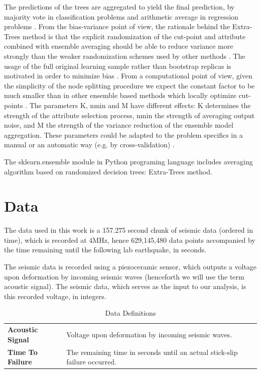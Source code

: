 \documentclass[]{llncs} %
\begin{document}
The predictions of the trees are aggregated to yield the final prediction, by majority vote in classification problems and arithmetic average in regression problems \cite{ExtremeRandomTrees}. From the bias-variance point of view, the rationale behind the Extra-Trees method is that the explicit randomization of the cut-point and attribute combined with ensemble averaging should be able to reduce variance more strongly than the weaker randomization schemes used by other methods \cite{ExtremeRandomTrees}. The usage of the full original learning sample rather than bootstrap replicas is motivated in order to minimize bias \cite{ExtremeRandomTrees}. From a computational point of view, given the simplicity of the node splitting procedure we expect the constant factor to be much smaller than in other ensemble based methods which locally optimize cut-points \cite{ExtremeRandomTrees}. The parameters K, nmin and M have different effects: K determines the strength of the attribute selection process, nmin the strength of averaging output noise, and M the strength of the variance reduction of the ensemble model aggregation. These parameters could be adapted to the problem specifics in a manual or an automatic way (e.g. by cross-validation) \cite{ExtremeRandomTrees}. \par

The sklearn.ensemble module in Python programing language includes averaging algorithm based on randomized decision trees: Extra-Trees method. \par

\section{Data} 
The data used in this work is a  157.275 second chunk of seismic data (ordered in time), which is recorded at 4MHz, hence 629,145,480 data points accompanied by the time remaining until the following lab earthquake, in seconds. \par
The seismic data is recorded using a piezoceramic sensor, which outputs a voltage upon deformation by incoming seismic waves (henceforth we will use the term acoustic signal). The seismic data, which serves as the input to our analysis, is this recorded voltage, in integers. \par
\begin{table}[h!]
	\begin{center}
		\caption{Data Definitions}
		\label{tab:DataDefinitions}
		\begin{tabular}{ll}
			\textbf{Acoustic Signal} & Voltage upon deformation by incoming seismic waves. \\
			\textbf{Time To Failure} & The remaining time in seconds until an actual stick-slip failure occurred.  \\
		\end{tabular}
	\end{center}
\end{table}
\end{document}
